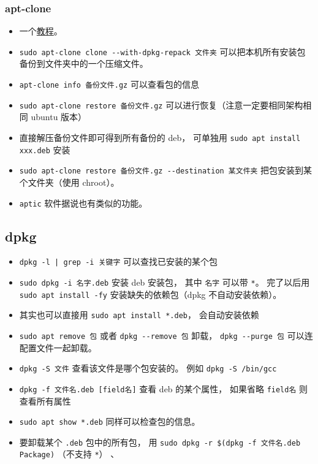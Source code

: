\subsubsection{apt-clone}
\begin{itemize}
\item 一个\href{https://ubunlog.com/en/apt-clone-copia-seguridad-paquetes/}{教程}。
\item \verb`sudo apt-clone clone --with-dpkg-repack 文件夹` 可以把本机所有安装包备份到文件夹中的一个压缩文件。
\item \verb`apt-clone info 备份文件.gz` 可以查看包的信息
\item \verb`sudo apt-clone restore 备份文件.gz` 可以进行恢复（注意一定要相同架构相同 ubuntu 版本）
\item 直接解压备份文件即可得到所有备份的 deb， 可单独用 \verb`sudo apt install xxx.deb` 安装
\item \verb`sudo apt-clone restore 备份文件.gz --destination 某文件夹` 把包安装到某个文件夹（使用 chroot）。
\item \verb`aptic` 软件据说也有类似的功能。
\end{itemize}



\subsection{dpkg}
\begin{itemize}
\item \verb`dpkg -l | grep -i 关键字` 可以查找已安装的某个包
\item \verb`sudo dpkg -i 名字.deb` 安装 deb 安装包， 其中 \verb`名字` 可以带 \verb`*`。 完了以后用 \verb`sudo apt install -fy` 安装缺失的依赖包（dpkg 不自动安装依赖）。
\item 其实也可以直接用 \verb`sudo apt install *.deb`， 会自动安装依赖
\item \verb`sudo apt remove 包` 或者 \verb`dpkg --remove 包` 卸载， \verb`dpkg --purge 包` 可以连配置文件一起卸载。
\item \verb`dpkg -S 文件` 查看该文件是哪个包安装的。 例如 \verb`dpkg -S /bin/gcc`
\item \verb`dpkg -f 文件名.deb [field名]` 查看 deb 的某个属性， 如果省略 \verb`field名` 则查看所有属性
\item \verb`sudo apt show *.deb` 同样可以检查包的信息。
\item 要卸载某个 \verb`.deb` 包中的所有包， 用 \verb`sudo dpkg -r $(dpkg -f 文件名.deb Package)` （不支持 \verb`*`）
、
\end{itemize}

